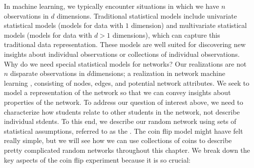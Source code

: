 \documentclass[letterpaper,10pt,english]{jupyterBook}
\begin{document}
\sphinxAtStartPar
In machine learning, we typically encounter situations in which we have \(n\) observations in \(d\) dimensions. Traditional statistical models include univariate statistical models (models for data with \(1\) dimension) and multivariate statistical models (models for data with \(d > 1\) dimensions), which can capture this traditional data representation. These models are well suited for discovering new insights about individual observations or collections of individual observations. Why do we need special statistical models for networks? Our realizations are not \(n\) disparate observations in \(d\)\sphinxhyphen{}dimensions; a realization in network machine learning , consisting of nodes, edges, and potential network attributes. We seek to model a representation of the  network so that we can convey insights about properties of the network. To address our question of interest above, we need to characterize how students relate to other students in the network, not describe individual stdents. To this end, we describe our random network using sets of statistical assumptions, referred to as the . The coin flip model might haave felt really simple, but we will see how we can use collections of coins to describe pretty complicated random networks throughout this chapter. We break down the key aspects of the coin flip experiment because it is so crucial:
\end{document}
